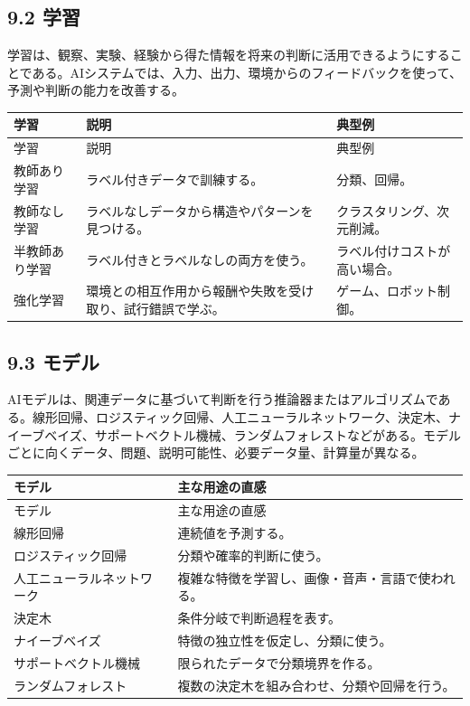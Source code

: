 \documentclass[a4paper,11pt]{ltjsarticle}
\begin{document}
\subsection{9.2 学習}

学習は、観察、実験、経験から得た情報を将来の判断に活用できるようにすることである。AIシステムでは、入力、出力、環境からのフィードバックを使って、予測や判断の能力を改善する。

\begin{longtable}{>{\raggedright\arraybackslash}p{}>{\raggedright\arraybackslash}p{}>{\raggedright\arraybackslash}p{}}
\toprule
学習 & 説明 & 典型例 \\
\midrule
\endfirsthead
\toprule
学習 & 説明 & 典型例 \\
\midrule
\endhead
教師あり学習 & ラベル付きデータで訓練する。 & 分類、回帰。 \\
教師なし学習 & ラベルなしデータから構造やパターンを見つける。 & クラスタリング、次元削減。 \\
半教師あり学習 & ラベル付きとラベルなしの両方を使う。 & ラベル付けコストが高い場合。 \\
強化学習 & 環境との相互作用から報酬や失敗を受け取り、試行錯誤で学ぶ。 & ゲーム、ロボット制御。 \\
\bottomrule
\end{longtable}

\subsection{9.3 モデル}

AIモデルは、関連データに基づいて判断を行う推論器またはアルゴリズムである。線形回帰、ロジスティック回帰、人工ニューラルネットワーク、決定木、ナイーブベイズ、サポートベクトル機械、ランダムフォレストなどがある。モデルごとに向くデータ、問題、説明可能性、必要データ量、計算量が異なる。

\begin{longtable}{>{\raggedright\arraybackslash}p{}>{\raggedright\arraybackslash}p{}}
\toprule
モデル & 主な用途の直感 \\
\midrule
\endfirsthead
\toprule
モデル & 主な用途の直感 \\
\midrule
\endhead
線形回帰 & 連続値を予測する。 \\
ロジスティック回帰 & 分類や確率的判断に使う。 \\
人工ニューラルネットワーク & 複雑な特徴を学習し、画像・音声・言語で使われる。 \\
決定木 & 条件分岐で判断過程を表す。 \\
ナイーブベイズ & 特徴の独立性を仮定し、分類に使う。 \\
サポートベクトル機械 & 限られたデータで分類境界を作る。 \\
ランダムフォレスト & 複数の決定木を組み合わせ、分類や回帰を行う。 \\
\bottomrule
\end{longtable}
\end{document}
